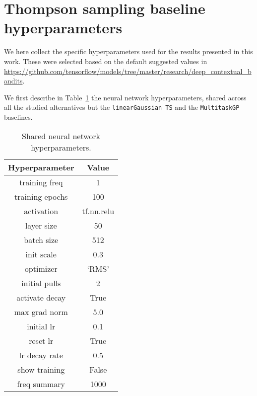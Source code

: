\section{Thompson sampling baseline hyperparameters}
\label{asec:evaluation_hyperparameters}

We here collect the specific hyperparameters used for the results presented in this work. These were selected based on the default suggested values in \href{https://github.com/tensorflow/models/tree/master/research/deep_contextual_bandits}{https://github.com/tensorflow/models/tree/master/research/deep\_contextual\_bandits}.

We first describe in Table~\ref{tab:neural_network_hyperparameters} the neural network hyperparameters, shared across all the studied alternatives but the \texttt{linearGaussian TS} and the \texttt{MultitaskGP} baselines.

\begin{table}[!h]
	\caption{Shared neural network hyperparameters.}
	\label{tab:neural_network_hyperparameters}
	\vspace*{-2ex}
	\begin{center}
		\begin{tabular}{|c|c|}
			\hline
			Hyperparameter\cellcolor[gray]{0.6} & Value \cellcolor[gray]{0.6} \\ \hline
training freq & 1 \\ \hline
training epochs & 100 \\ \hline
activation & tf.nn.relu \\ \hline
layer size & 50 \\ \hline
batch size & 512 \\ \hline
init scale & 0.3 \\ \hline
optimizer & `RMS' \\ \hline
initial pulls & 2 \\ \hline
activate decay & True \\ \hline
max grad norm & 5.0 \\ \hline
initial lr & 0.1 \\ \hline
reset lr & True \\ \hline
lr decay rate & 0.5 \\ \hline
show training & False \\ \hline
freq summary & 1000 \\ \hline
		\end{tabular}
	\end{center}
\end{table}

